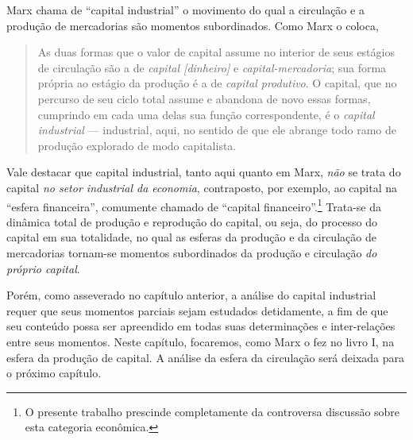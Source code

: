 Marx chama de ``capital industrial'' o movimento do qual a circulação e a produção de mercadorias são momentos subordinados. Como Marx o coloca,

\begin{quote}
As duas formas que o valor de capital assume no interior de seus estágios de circulação são a de \emph{capital {[}dinheiro{]}} e \emph{capital-mercadoria}; sua forma própria ao estágio da produção é a de \emph{capital produtivo}. O capital, que no percurso de seu ciclo total assume e abandona de novo essas formas, cumprindo em cada uma delas sua função correspondente, é o \emph{capital industrial} --- industrial, aqui, no sentido de que ele abrange todo ramo de produção explorado de modo capitalista. \parencite[p. 131]{Marx2014}
\end{quote}

Vale destacar que capital industrial, tanto aqui quanto em Marx, \emph{não} se trata do capital \emph{no setor industrial da economia}, contraposto, por exemplo, ao capital na ``esfera financeira'', comumente chamado de ``capital financeiro''.\footnote{O presente trabalho prescinde completamente da controversa discussão sobre esta categoria econômica.} Trata-se da dinâmica total de produção e reprodução do capital, ou seja, do processo do capital em sua totalidade, no qual as esferas da produção e da circulação de mercadorias tornam-se momentos subordinados da produção e circulação \textit{do próprio capital}. 

Porém, como asseverado no capítulo anterior, a análise do capital industrial requer que seus momentos parciais sejam estudados detidamente, a fim de que seu conteúdo possa ser apreendido em todas suas determinações e inter-relações entre seus momentos. Neste capítulo, focaremos, como Marx o fez no livro I, na esfera da produção de capital. A análise da esfera da circulação será deixada para o próximo capítulo.

%
%
%

